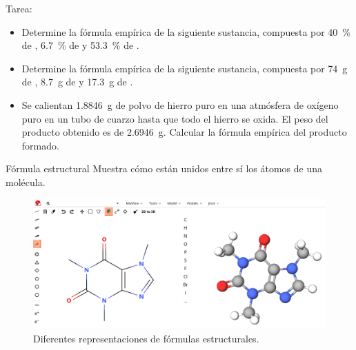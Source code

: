 \documentclass{beamer}
\begin{document}
  \begin{frame}{Tarea:}
    \begin{itemize}
      \item Determine la fórmula empírica de la siguiente sustancia, compuesta por \qty{40}{\percent} de , \qty{6.7}{\percent} de  y \qty{53.3}{\percent} de .
      \item Determine la fórmula empírica de la siguiente sustancia, compuesta por \qty{74}{\gram} de , \qty{8.7}{\gram} de  y \qty{17.3}{\gram} de .
      \item Se calientan \qty{1.8846}{\gram} de polvo de hierro puro en una atmósfera de oxígeno puro en un tubo de cuarzo hasta que todo el hierro se oxida. El peso del producto obtenido es de \qty{2.6946}{\gram}. Calcular la fórmula empírica del producto formado.
    \end{itemize}
  \end{frame}
  \begin{frame}{Fórmula estructural}
    Muestra cómo están unidos entre sí los átomos de una molécula.
    \begin{figure}
      \centering
      \includegraphics[width=0.9\linewidth]{imgs/bolitasypalitos}
      \caption{Diferentes representaciones de fórmulas estructurales.}
      \label{fig:bolitasypalitos}
    \end{figure}      
  \end{frame}
\end{document}
